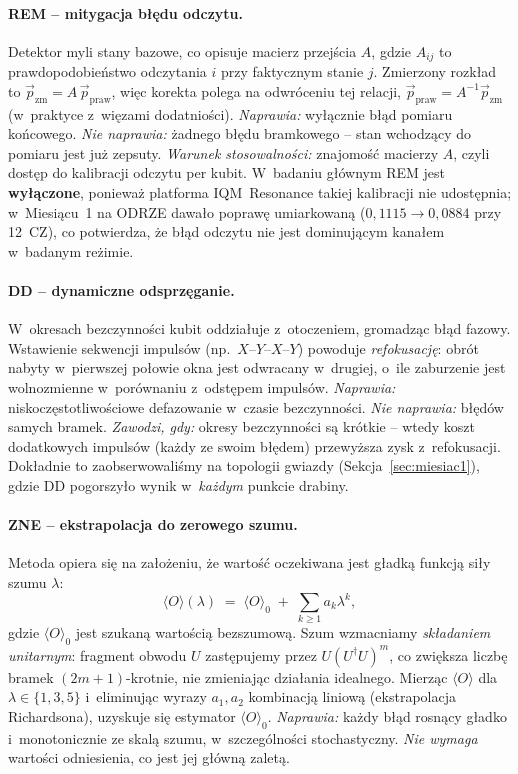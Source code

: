 \documentclass[11pt]{article}
\newcommand{\expv}{\langle O\rangle}
\begin{document}
\paragraph{REM -- mitygacja błędu odczytu.} Detektor myli stany bazowe, co opisuje macierz przejścia
$A$, gdzie $A_{ij}$ to prawdopodobieństwo odczytania $i$ przy faktycznym stanie $j$. Zmierzony
rozkład to $\vec{p}_{\text{zm}} = A\,\vec{p}_{\text{praw}}$, więc korekta polega na odwróceniu tej
relacji, $\vec{p}_{\text{praw}} = A^{-1}\vec{p}_{\text{zm}}$ (w~praktyce z~więzami dodatniości).
\emph{Naprawia:} wyłącznie błąd pomiaru końcowego. \emph{Nie naprawia:} żadnego błędu bramkowego --
stan wchodzący do pomiaru jest już zepsuty. \emph{Warunek stosowalności:} znajomość macierzy $A$,
czyli dostęp do kalibracji odczytu per kubit. W~badaniu głównym REM jest \textbf{wyłączone},
ponieważ platforma IQM~Resonance takiej kalibracji nie udostępnia; w~Miesiącu~1 na ODRZE dawało
poprawę umiarkowaną ($0{,}1115 \to 0{,}0884$ przy 12~CZ), co potwierdza, że błąd odczytu nie jest
dominującym kanałem w~badanym reżimie.

\paragraph{DD -- dynamiczne odsprzęganie.} W~okresach bezczynności kubit oddziałuje z~otoczeniem,
gromadząc błąd fazowy. Wstawienie sekwencji impulsów (np.\ $X$--$Y$--$X$--$Y$) powoduje
\emph{refokusację}: obrót nabyty w~pierwszej połowie okna jest odwracany w~drugiej, o~ile zaburzenie
jest wolnozmienne w~porównaniu z~odstępem impulsów. \emph{Naprawia:} niskoczęstotliwościowe
defazowanie w~czasie bezczynności. \emph{Nie naprawia:} błędów samych bramek. \emph{Zawodzi, gdy:}
okresy bezczynności są krótkie -- wtedy koszt dodatkowych impulsów (każdy ze swoim błędem)
przewyższa zysk z~refokusacji. Dokładnie to zaobserwowaliśmy na topologii gwiazdy
(Sekcja~\ref{sec:miesiac1}), gdzie DD pogorszyło wynik w~\emph{każdym} punkcie drabiny.

\paragraph{ZNE -- ekstrapolacja do zerowego szumu.} Metoda opiera się na założeniu, że wartość
oczekiwana jest gładką funkcją siły szumu $\lambda$:
\begin{equation}
  \expv(\lambda) \;=\; \expv_0 \;+\; \sum_{k\ge 1} a_k \lambda^k ,
  \label{eq:zne-exp}
\end{equation}
gdzie $\expv_0$ jest szukaną wartością bezszumową. Szum wzmacniamy \emph{składaniem unitarnym}:
fragment obwodu $U$ zastępujemy przez $U(U^{\dagger}U)^{m}$, co zwiększa liczbę bramek
$(2m{+}1)$-krotnie, nie zmieniając działania idealnego. Mierząc $\expv$ dla
$\lambda \in \{1,3,5\}$ i~eliminując wyrazy $a_1, a_2$ kombinacją liniową (ekstrapolacja
Richardsona), uzyskuje się estymator $\expv_0$. \emph{Naprawia:} każdy błąd rosnący gładko
i~monotonicznie ze skalą szumu, w~szczególności stochastyczny. \emph{Nie wymaga} wartości
odniesienia, co jest jej główną zaletą.
\end{document}
